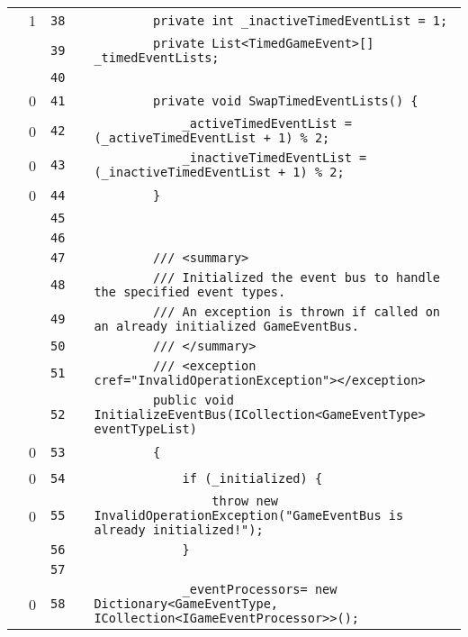 \documentclass[a4paper,landscape,10pt]{article}
\begin{document}
\begin{longtable}[l]{lrrll}
\cellcolor{green} & 1 & \verb~38~ & & \verb~        private int _inactiveTimedEventList = 1;~\\
\cellcolor{gray} &  & \verb~39~ & & \verb~        private List<TimedGameEvent>[] _timedEventLists;~\\
\cellcolor{gray} &  & \verb~40~ & & \verb~~\\
\cellcolor{red} & 0 & \verb~41~ & & \verb~        private void SwapTimedEventLists() {~\\
\cellcolor{red} & 0 & \verb~42~ & & \verb~            _activeTimedEventList = (_activeTimedEventList + 1) % 2;~\\
\cellcolor{red} & 0 & \verb~43~ & & \verb~            _inactiveTimedEventList = (_inactiveTimedEventList + 1) % 2;~\\
\cellcolor{red} & 0 & \verb~44~ & & \verb~        }~\\
\cellcolor{gray} &  & \verb~45~ & & \verb~~\\
\cellcolor{gray} &  & \verb~46~ & & \verb~~\\
\cellcolor{gray} &  & \verb~47~ & & \verb~        /// <summary>~\\
\cellcolor{gray} &  & \verb~48~ & & \verb~        /// Initialized the event bus to handle the specified event types.~\\
\cellcolor{gray} &  & \verb~49~ & & \verb~        /// An exception is thrown if called on an already initialized GameEventBus.~\\
\cellcolor{gray} &  & \verb~50~ & & \verb~        /// </summary>~\\
\cellcolor{gray} &  & \verb~51~ & & \verb~        /// <exception cref="InvalidOperationException"></exception>~\\
\cellcolor{gray} &  & \verb~52~ & & \verb~        public void InitializeEventBus(ICollection<GameEventType> eventTypeList)~\\
\cellcolor{red} & 0 & \verb~53~ & & \verb~        {~\\
\cellcolor{red} & 0 & \verb~54~ & & \verb~            if (_initialized) {~\\
\cellcolor{red} & 0 & \verb~55~ & & \verb~                throw new InvalidOperationException("GameEventBus is already initialized!");~\\
\cellcolor{gray} &  & \verb~56~ & & \verb~            }~\\
\cellcolor{gray} &  & \verb~57~ & & \verb~~\\
\cellcolor{red} & 0 & \verb~58~ & & \verb~            _eventProcessors= new Dictionary<GameEventType, ICollection<IGameEventProcessor>>();~\\

\end{longtable}
\end{document}
